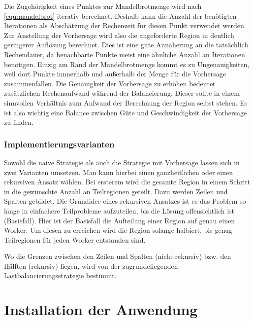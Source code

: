 Die Zugehörigkeit eines Punktes zur Mandelbrotmenge wird nach \autoref{equ:mandelbrot} iterativ berechnet.
Deshalb kann die Anzahl der benötigten Iterationen als Abschätzung der Rechenzeit für diesen Punkt verwendet werden.
Zur Anstellung der Vorhersage wird also die angeforderte Region in deutlich geringerer Auflösung berechnet.
Dies ist eine gute Annäherung an die tatsächlich Rechendauer, da benachbarte Punkte meist eine ähnliche Anzahl an Iterationen benötigen.
Einzig am Rand der Mandelbrotmenge kommt es zu Ungenauigkeiten, weil dort Punkte innnerhalb und außerhalb der Menge für die Vorhersage zusammenfallen.
Die Genauigkeit der Vorhersage zu erhöhen bedeutet zusätzlichen Rechenaufwand während der Balancierung.
Dieser sollte in einem sinnvollen Verhältnis zum Aufwand der Berechnung der Region selbst stehen.
Es ist also wichtig eine Balance zwischen Güte und Geschwindigkeit der Vorhersage zu finden.

\subsubsection{Implementierungsvarianten}

Sowohl die naive Strategie als auch die Strategie mit Vorhersage lassen sich in zwei Varianten umsetzen.
Man kann hierbei einen ganzheitlichen oder einen rekursiven Ansatz wählen.
Bei ersterem wird die gesamte Region in einem Schritt in die gewünschte Anzahl an Teilregionen geteilt.
Dazu werden Zeilen und Spalten gebildet.
Die Grundidee eines rekursiven Ansatzes ist es das Problem so lange in einfachere Teilprobleme aufzuteilen, bis die Lösung offensichtlich ist (Basisfall).
Hier ist der Basisfall die Aufteilung einer Region auf genau einen Worker.
Um diesen zu erreichen wird die Region solange halbiert, bis genug Teilregionen für jeden Worker entstanden sind.

Wo die Grenzen zwischen den Zeilen und Spalten (nicht-rekursiv) bzw. den Hälften (rekursiv) liegen, wird von der zugrundeliegenden Lastbalancierungsstrategie bestimmt.


\section{Installation der Anwendung}

